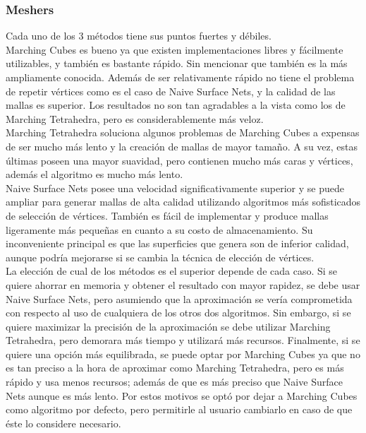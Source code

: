 \documentclass[12pt]{article}
\begin{document}
\subsubsection{Meshers}
Cada uno de los 3 métodos tiene sus puntos fuertes y débiles. 
\\Marching Cubes es bueno ya que existen implementaciones libres y fácilmente utilizables, y también es bastante rápido. Sin mencionar que también es la más ampliamente conocida. Además de ser relativamente rápido no tiene el problema de repetir vértices como es el caso de Naive Surface Nets, y la calidad de las mallas es superior. Los resultados no son tan agradables a la vista como los de Marching Tetrahedra, pero es considerablemente más veloz. 
\\Marching Tetrahedra soluciona algunos problemas de Marching Cubes a expensas de ser mucho más lento y la creación de mallas de mayor tamaño. A su vez, estas últimas poseen una mayor suavidad, pero contienen mucho más caras y vértices, además  el algoritmo es mucho más lento.
\\Naive Surface Nets posee una velocidad significativamente superior y se puede ampliar para generar mallas de alta calidad utilizando algoritmos más sofisticados de selección de vértices. También es fácil de implementar y produce mallas ligeramente más pequeñas en cuanto a su costo de almacenamiento. Su inconveniente principal es que las superficies que genera son de inferior calidad, aunque podría mejorarse si se cambia la técnica de elección de vértices. 
\\La elección de cual de los métodos es el superior depende de cada caso. Si se quiere ahorrar en memoria y obtener el resultado con mayor rapidez, se debe usar Naive Surface Nets, pero asumiendo que la aproximación se vería comprometida con respecto al uso de cualquiera de los otros dos algoritmos. Sin embargo, si se quiere maximizar la precisión de la aproximación se debe utilizar Marching Tetrahedra, pero demorara más tiempo y utilizará más recursos. Finalmente, si se quiere una opción más equilibrada, se puede optar por Marching Cubes ya que no es tan preciso a la hora de aproximar como Marching Tetrahedra, pero es más rápido y usa menos recursos; además de que es más preciso que Naive Surface Nets aunque es más lento. Por estos motivos se optó por dejar a Marching Cubes como algoritmo por defecto, pero permitirle al usuario cambiarlo en caso de que éste lo considere necesario.
\end{document}
